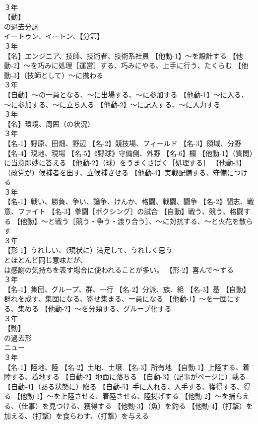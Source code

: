 \documentclass[8pt]{extreport}
\begin{document}
\begin{CJK}{UTF8}{min}
\\	３年	
\\	【動】
\\	の過去分詞 
\\	イートゥン、イートン、【分節】
\\	３年	
\\	【名】エンジニア、技師、技術者、技術系社員 【他動-1】～を設計する 【他動-2】～を巧みに処理［運営］する、巧みにやる、上手に行う、たくらむ 【他動-3】（技師として）～に携わる
\\	３年	
\\	【自動】～の一員となる、～に出場する、～に参加する 【他動-1】～に入る、～に参加する、～に立ち入る 【他動-2】～に記入する、～に入力する
\\	３年	
\\	【名】環境、周囲（の状況）
\\	３年	
\\	【名-1】野原、田畑、野辺 【名-2】競技場、フィールド 【名-3】領域、分野 【名-4】現地、現場 【名-5】《野球》守備側、外野 【名-6】欄 【他動-1】（質問）に当意即妙に答える 【他動-2】（球）をうまくさばく［処理する］ 【他動-3】（政党が）候補者を出す、立候補させる 【他動-4】実戦配備する、守備につける
\\	３年	
\\	【名-1】戦い、勝負、争い、論争、けんか、格闘、戦闘、闘争 【名-2】闘志、戦意、ファイト 【名-3】拳闘［ボクシング］の試合 【自動】戦う、競う、格闘する 【他動】～と戦う［競う・争う・渡り合う］、～に対抗する、～と火花を散らす
\\	３年	
\\	【形-1】うれしい、（現状に）満足して、うれしく思う
\\	とほとんど同じ意味だが、
\\	は感謝の気持ちを表す場合に使われることが多い。 【形-2】喜んで～する
\\	３年	
\\	【名-1】集団、グループ、群、一行 【名-2】分派、族、組 【名-3】基 【自動】群れを成す、集団になる、寄せ集まる、一員になる 【他動-1】～を一団にする、集める 【他動-2】～を分類する、グループ化する
\\	３年	
\\	【動】
\\	の過去形 
\\	ニュー
\\	３年	
\\	【名-1】陸地、陸 【名-2】土地、土壌 【名-3】所有地 【自動-1】上陸する、着陸する、着地する 【自動-2】地面に落ちる 【自動-3】（記事がページに）載る 【自動-4】（ある状態に）陥る 【自動-5】手に入れる、入手する、獲得する、得る 【他動-1】～を上陸させる、着陸させる、陸揚げする 【他動-2】～を捕らえる、（仕事）を見つける、獲得する 【他動-3】（魚）を釣る 【他動-4】（打撃）を加える、（打撃）を食らわす、（打撃）を与える

\end{CJK}
\end{document}
